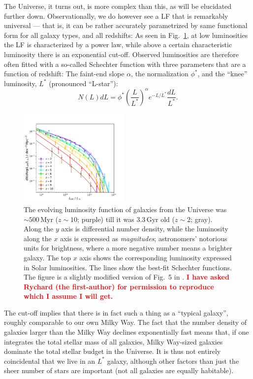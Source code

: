 \documentclass[useAMS,usenatbib,bibyear]{aa}
\newcommand{\red}[1]{\textcolor{red}{\textbf{#1}}}
\begin{document}
The Universe, it turns out, is more complex than this, as will be elucidated further down.
Observationally, we do however see a LF that is remarkably universal --- that is, it can be rather accurately parametrized by same functional form for all galaxy types, and all redshifts:
As seen in Fig.~\ref{fig:LF}, at low luminosities the LF is characterized by a power law, while above a certain characteristic luminosity there is an exponential cut-off.
Observed luminosities are therefore often fitted with a so-called Schechter function \citep{Schechter1976} with three parameters that are a function of redshift: The faint-end slope $\alpha$, the normalization $\phi^*$, and the ``knee'' luminosity, $L^*$ (pronounced ``L-star''):
\begin{equation}
    \label{eq:LF}
    N(L)dL=\phi^* \left({\frac{L}{L^*}}\right)^{\alpha} e^{-L/L^*}{\frac{dL}{L^*}}.
\end{equation}
\begin{figure}[!t]
    \centering
    \includegraphics [width=0.48\textwidth] {bouwens2021.pdf}
    \caption{The evolving luminosity function of galaxies from the Universe was $\sim500\,\mathrm{Myr}$ ($z\sim10$; purple) till it was $3.3\,\mathrm{Gyr}$ old ($z\sim2$; gray).
    Along the $y$ axis is differential number density, while the luminosity along the $x$ axis is expressed as \emph{magnitudes}; astronomers' notorious units for brightness, where a more negative number means a brighter galaxy.
    The top $x$ axis shows the corresponding luminosity expressed in Solar luminosities.
    The lines show the best-fit Schechter functions.
    The figure is a slightly modified version of Fig.~5 in \citep{Bouwens2021}.
    \red{I have asked Rychard (the first-author) for permission to reproduce which I assume I will get.}
    }
    \label{fig:LF}
\end{figure}
The cut-off implies that there is in fact such a thing as a ``typical galaxy'', roughly comparable to our own Milky Way.
The fact that the number density of galaxies larger than the Milky Way declines exponentially fast means that, if one integrates the total stellar mass of all galaxies, Milky Way-sized galaxies dominate the total stellar budget in the Universe.
It is thus not entirely coincidental that we live in an $L^*$ galaxy, although other factors than just the sheer number of stars are important (not all galaxies are equally habitable).
\end{document}

